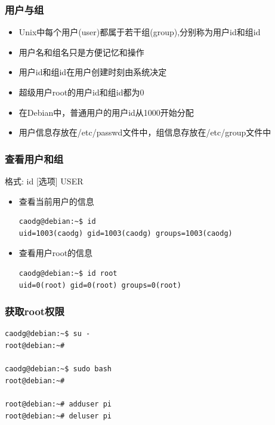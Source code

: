 \documentclass[compress]{beamer}
\begin{document}
\begin{frame}
    \frametitle{用户与组}
\begin{itemize}
\item Unix中每个用户(user)都属于若干组(group),分别称为用户id和组id

\item 用户名和组名只是方便记忆和操作

\item 用户id和组id在用户创建时刻由系统决定

\item 超级用户root的用户id和组id都为0

\item 在Debian中，普通用户的用户id从1000开始分配

\item
用户信息存放在/etc/passwd文件中，组信息存放在/etc/group文件中
\end{itemize}

\end{frame}

\begin{frame}[containsverbatim]
\frametitle{查看用户和组}

格式: \alert{id} [选项] USER

\begin{itemize}
\item 查看当前用户的信息\\[1ex]
\hspace*{-2em}\begin{Verbatim}
caodg@debian:~$ id
uid=1003(caodg) gid=1003(caodg) groups=1003(caodg)
\end{Verbatim}

\item 查看用户root的信息\\[1ex]
  \hspace*{-2em}
  \begin{Verbatim}
caodg@debian:~$ id root
uid=0(root) gid=0(root) groups=0(root)
\end{Verbatim}
\end{itemize}
\end{frame}

\begin{frame}[containsverbatim]
    \frametitle{获取root权限}
\begin{Verbatim}
caodg@debian:~$ su -
root@debian:~# 

caodg@debian:~$ sudo bash
root@debian:~# 

root@debian:~# adduser pi 
root@debian:~# deluser pi 
\end{Verbatim}
\end{frame}
\end{document}

